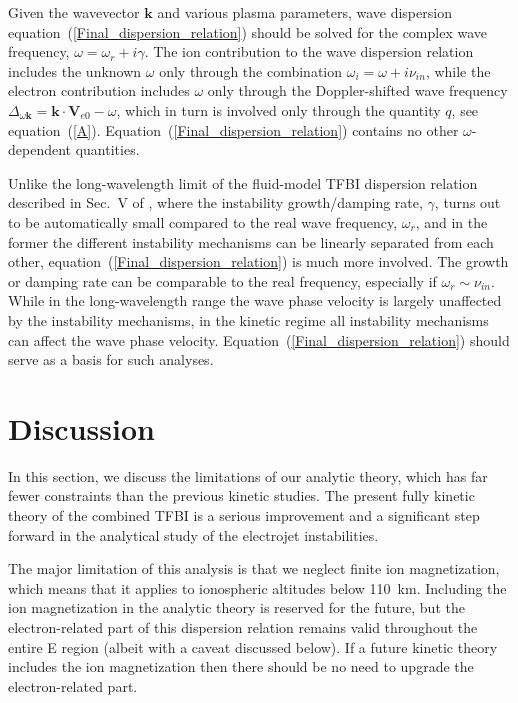 \documentclass[draft]{agujournal2019}
\renewcommand{\vec}{\mathbf}
\begin{document}
{Given the wavevector $\vec{k}$ and various plasma parameters, wave dispersion equation~(\ref{Final_dispersion_relation}) 
should be solved for the complex wave frequency, $\omega = \omega_r + i\gamma$. The ion contribution 
to the wave dispersion relation includes the unknown $\omega$ only through the  combination 
$\omega_i = \omega + i\nu_{in}$, while the electron contribution includes $\omega$ only through the Doppler-shifted wave frequency 
$\Delta_{\omega\vec{k}}=\vec{k}\cdot\vec{V}_{e0}-\omega$, which in turn is involved only through the quantity $q$, 
see equation~(\ref{A}). Equation~(\ref{Final_dispersion_relation}) contains no other $\omega$-dependent quantities.

Unlike the long-wavelength limit of the fluid-model TFBI dispersion relation 
described in Sec.~V of , where the instability
growth/damping rate, $\gamma$, turns out to be automatically small compared to the real wave frequency, $\omega_r$, and in the
former the different instability mechanisms can be linearly separated from
each other, equation~(\ref{Final_dispersion_relation}) is much more involved.
The growth or damping rate can be comparable to the real frequency, especially if
$\omega_r\sim\nu_{in}$. While in the long-wavelength range the wave phase
velocity is largely unaffected by the instability mechanisms, in the kinetic
regime all instability mechanisms can affect the wave phase velocity.
Equation~(\ref{Final_dispersion_relation}) should serve as a basis for such
analyses.

\section{Discussion\label{Discussion}}

In this section, we discuss the limitations of our analytic theory, which has far 
fewer constraints than the previous kinetic studies. The present fully kinetic theory
of the combined TFBI is a serious improvement and a significant step forward in the analytical study of the
electrojet instabilities.

The major limitation of this analysis is that we neglect finite ion magnetization, which
means that it applies to ionospheric altitudes below 110~km. Including the
ion magnetization in the analytic theory is reserved for the future, but the
electron-related part of this dispersion relation remains valid throughout the
entire E region (albeit with a caveat discussed below). If a future kinetic theory includes the ion
magnetization then there should be no need to upgrade the electron-related part.

}
\end{document}
